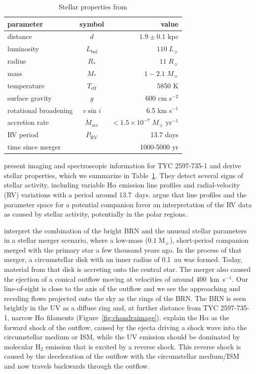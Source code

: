 \documentclass[linenumbers]{aastex631}
\begin{document}
\begin{table}
\caption{Stellar properties from \citet{2020Natur.587..387H} \label{tab:parameters}}
\begin{tabular}{lcr}
\hline \hline
parameter & symbol & value \\
\hline
distance & $d$ & $1.9 \pm 0.1$ kpc\\
luminosity & $L_\mathrm{bol}$ & $110 \;L_\sun{}$\\
radius & $R_*$ & $11\;R_\sun{}$\\
mass & $M_*$ & $1-2.1\;M_\sun{}$\\
temperature & $T_\mathrm{eff}$ & 5850 K\\
surface gravity & $g$ & 600 cm s$^{-2}$\\
rotational broadening & $v \sin i$ & 6.5 km s$^{-1}$\\
accretion rate & $\dot M_\mathrm{acc}$ & $<1.5 \times 10^{-7}\; M_\sun{}\;\mathrm{yr}^{-1}$\\
RV period & $P_\mathrm{RV}$ & 13.7 days \\
time since merger & & 1000-5000 yr\\
\hline
\end{tabular}
\end{table}

\cite{2020Natur.587..387H} present imaging and spectroscopic information for TYC 2597-735-1 and derive stellar properties, which we summarize in Table~\ref{tab:parameters}. They detect several signs of stellar activity, including variable H$\alpha$ emission line profiles and radial-velocity (RV)  variations with a period around 13.7~days. \cite{2020Natur.587..387H} argue that line profiles and the parameter space for a potential companion favor an interpretation of the RV data as caused by stellar activity, potentially in the polar regions.

\cite{2020Natur.587..387H} interpret the combination of the bright BRN and the unusual stellar parameters in a stellar merger scenario, where a low-mass ($0.1\;\mathrm{M}_\sun$), short-period companion merged with the primary star a few thousand years ago. In the process of that merger, a circumstellar disk with an inner radius of 0.1~au was formed. Today, material from that disk is accreting onto the central star. The merger also caused the ejection of a conical outflow moving at velocities of around 400~km~s$^{-1}$. Our line-of-sight is close to the axis of the outflow and we see the approaching and receding flows projected onto the sky as the rings of the BRN.
The BRN is seen brightly in the UV as a diffuse ring and, at further distance from TYC 2597-735-1, narrow H$\alpha$ filaments (Figure~\ref{fig:chandraimage}). \cite{2020Natur.587..387H} explain the H$\alpha$ as the forward shock of the outflow, caused by the ejecta driving a shock wave into the circumstellar medium or ISM, while the UV emission should be dominated by molecular H$_2$ emission that is excited by a reverse shock. This reverse shock is caused by the deceleration of the outflow with the circumstellar medium/ISM and now travels backwards through the outflow.
\end{document}
